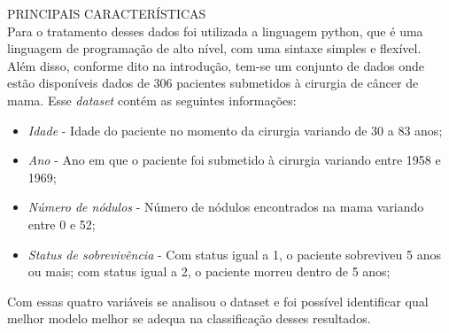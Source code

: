 
\noindent \textcolor{COLOR2}{PRINCIPAIS CARACTERÍSTICAS}
\\

Para o tratamento desses dados foi utilizada a linguagem python, que é uma linguagem de programação de alto nível, com uma sintaxe simples e flexível.\\

Além disso, conforme dito na introdução, tem-se um conjunto de dados onde estão disponíveis dados de 306 pacientes submetidos à cirurgia de câncer de mama. Esse \textit{dataset} contém as seguintes informações:
\begin{itemize}
    \item \textit{Idade} - Idade do paciente no momento da cirurgia variando de 30 a 83 anos;
    \item \textit{Ano} - Ano em que o paciente foi submetido à cirurgia variando entre 1958 e 1969;
    \item \textit{Número de nódulos} - Número de nódulos encontrados na mama variando entre 0 e 52;
    \item \textit{Status de sobrevivência} - Com status igual a 1, o paciente sobreviveu 5 anos ou mais; com status igual a 2, o paciente morreu dentro de 5 anos;
\end{itemize}

Com essas quatro variáveis se analisou o dataset e foi possível identificar qual melhor modelo melhor se adequa na classificação desses resultados.\\